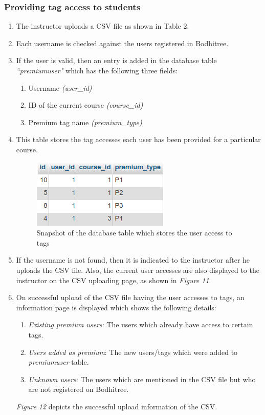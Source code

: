 \newpage

\subsubsection{Providing tag access to students}

\begin{enumerate}
	\item The instructor uploads a CSV file as shown in Table 2.
	\item Each username is checked against the users registered in Bodhitree.
	\item If the user is valid, then an entry is added in the database table \textit{``premiumuser"} which has the following three fields:
	\begin{enumerate}
		\item Username \textit{(user\_id)}
		\item ID of the current course \textit{(course\_id)}
		\item Premium tag name \textit{(premium\_type)}
	\end{enumerate}
	\item This table stores the tag accesses each user has been provided for a particular course.
	
	\begin{figure}[h]
	\centering
	\includegraphics[width=0.4\linewidth]{./media/premiumAccesses}
	\caption{Snapshot of the database table which stores the user access to tags}
	\label{fig:premiumAccesses}
	\end{figure}
	
	\item If the username is not found, then it is indicated to the instructor after he uploads the CSV file. Also, the current user accesses are also displayed to the instructor on the CSV uploading page, as shown in \textit{Figure 11}.
	
	\item On successful upload of the CSV file having the user accesses to tags, an information page is displayed which shows the following details:
	
	\begin{enumerate}
		\item \textit{Existing premium users}: The users which already have access to certain tags.
		\item \textit{Users added as premium}: The new users/tags which were added to \textit{premiumuser} table.
		\item \textit{Unknown users}: The users which are mentioned in the CSV file but who are not registered on Bodhitree.
	\end{enumerate}
		
	\textit{Figure 12} depicts the successful upload information of the CSV.
	
\end{enumerate}

